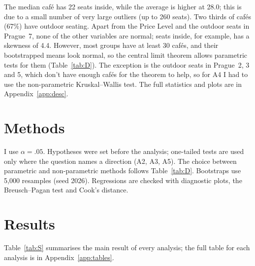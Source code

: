 \documentclass[11pt]{article}
\newcommand{\rtable}[1]{\resizebox{\ifdim\width>\textwidth\textwidth\else\width\fi}{!}{}}
\begin{document}
The median café has 22 seats inside, while the average is higher at 28.0; this is due to a small number of very large outliers (up to 260 seats). Two thirds of cafés (67\%) have outdoor seating. Apart from the Price Level and the outdoor seats in Prague~7, none of the other variables are normal; seats inside, for example, has a skewness of 4.4. However, most groups have at least 30 cafés, and their bootstrapped means look normal, so the central limit theorem allows parametric tests for them (Table~\ref{tab:D}). The exception is the outdoor seats in Prague~2, 3 and 5, which don't have enough cafés for the theorem to help, so for A4 I had to use the non-parametric Kruskal--Wallis test. The full statistics and plots are in Appendix~\ref{app:desc}.

\begin{table}[H]\centering
\caption{Decision table: for each variable and compared group, whether the variable is normal, whether the central limit theorem applies (n $\ge$ 30 and bootstrapped means look normal, 5{,}000 resamples, seed 2026), and the resulting choice of method.}
\label{tab:D}
\rtable{D_table.tex}
\end{table}

\section{Methods}
I use $\alpha = .05$. Hypotheses were set before the analysis; one-tailed tests are used only where the question names a direction (A2, A3, A5). The choice between parametric and non-parametric methods follows Table~\ref{tab:D}. Bootstraps use 5{,}000 resamples (seed 2026). Regressions are checked with diagnostic plots, the Breusch--Pagan test and Cook's distance.

\section{Results}
Table~\ref{tab:S} summarises the main result of every analysis; the full table for each analysis is in Appendix~\ref{app:tables}.

\begin{table}[H]\centering
\caption{Summary of the ten analyses. Estimates with 95\% CIs; p-values one-tailed for A2, A3 and A5, two-tailed otherwise.}
\label{tab:S}
\rtable{S_summary_table.tex}
\end{table}
\end{document}
